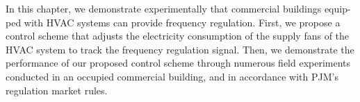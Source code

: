 \documentclass[../../thesis.tex]{subfiles}
\begin{document}
In this chapter, we demonstrate experimentally that commercial buildings equip-ped with HVAC systems can provide frequency regulation. First, we propose a control scheme that adjusts the electricity consumption of the supply fans of the HVAC system to track the frequency regulation signal. %
Then, we demonstrate the performance of our proposed control scheme through numerous field experiments conducted in an occupied commercial building, and in accordance with PJM's regulation market rules.







\end{document}
